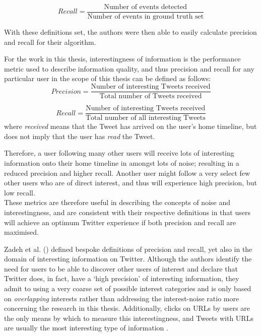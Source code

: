 \[
	Recall = \frac{\text{Number of events detected}}{\text{Number of events in ground truth set}}
\]

With these definitions set, the authors were then able to easily calculate precision and recall for their algorithm.

For the work in this thesis, interestingness of information is the performance metric used to describe information quality, and thus precision and recall for any particular user in the scope of this thesis can be defined as follows:
\[
	Precision = \frac{\text{Number of interesting Tweets received}}{\text{Total number of Tweets received}}
\]

\[
	Recall = \frac{\text{Number of interesting Tweets received}}{\text{Total number of all interesting Tweets}}
\]
where \textit{received} means that the Tweet has arrived on the user's home timeline, but does not imply that the user has \textit{read} the Tweet.

Therefore, a user following many other users will receive lots of interesting information onto their home timeline in amongst lots of noise; resulting in a reduced precision and higher recall. Another user might follow a very select few other users who are of direct interest, and thus will experience high precision, but low recall.\\
These metrics are therefore useful in describing the concepts of noise and interestingness, and are consistent with their respective definitions in that users will achieve an optimum Twitter experience if both precision and recall are maximised.

Zadeh et al. (\cite{zadeh13}) defined bespoke definitions of precision and recall, yet also in the domain of interesting information on Twitter. Although the authors identify the need for users to be able to discover other users of interest and declare that Twitter does, in fact, have a `high precision' of interesting information, they admit to using a very coarse set of possible interest categories and is only based on \textit{overlapping} interests rather than addressing the interest-noise ratio more concerning the research in this thesis. Additionally, clicks on URLs by users are the only means by which to measure this interestingness, and Tweets with URLs are usually the most interesting type of information \cite{alonso10}.

